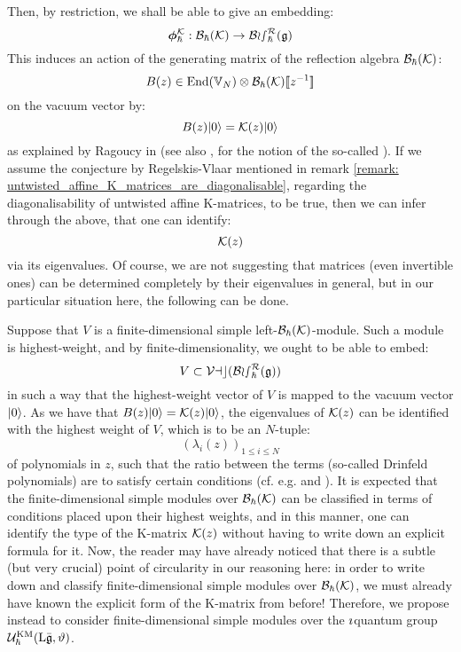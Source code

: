         Then, by restriction, we shall be able to give an embedding:
            $$\boldsymbol{\phi}_{\hbar}^{\mathcal{K}}: \mathcal{B}_{\hbar}(\mathcal{K}) \to \mathcal{Bos}_{\hbar}^{\mathcal{R}}(\mathfrak{g})$$
        This induces an action of the generating matrix of the reflection algebra $\mathcal{B}_{\hbar}(\mathcal{K})$:
            $$B(z) \in \End(\bbV_N) \tensor \calB_{\hbar}(\calK)[\![z^{-1}]\!]$$
        on the vacuum vector by:
            $$B(z) \lvert {0} \rangle = \mathcal{K}(z) \lvert {0} \rangle$$
        as explained by Ragoucy in \cite{ragoucy_vertex_representations_of_reflection_algebras} (see also \cite{ragoucy_vertex_representations_of_R_matrix_quantum_groups}, for the notion of the so-called ). If we assume the conjecture by Regelskis-Vlaar mentioned in remark \ref{remark: untwisted_affine_K_matrices_are_diagonalisable}, regarding the diagonalisability of untwisted affine K-matrices, to be true, then we can infer through the above, that one can identify:
            $$\mathcal{K}(z)$$
        via its eigenvalues. Of course, we are not suggesting that matrices (even invertible ones) can be determined completely by their eigenvalues in general, but in our particular situation here, the following can be done.

        Suppose that $V$ is a finite-dimensional simple left-$\mathcal{B}_{\hbar}(\mathcal{K})$-module. Such a module is highest-weight, and by finite-dimensionality, we ought to be able to embed:
            $$V \subset \mathcal{Vac}( \mathcal{Bos}_{\hbar}^{\mathcal{R}}(\mathfrak{g}) )$$
        in such a way that the highest-weight vector of $V$ is mapped to the vacuum vector $\lvert {0} \rangle$. As we have that $B(z) \lvert {0} \rangle = \mathcal{K}(z) \lvert {0} \rangle$, the eigenvalues of $\mathcal{K}(z)$ can be identified with the highest weight of $V$, which is to be an $N$-tuple:
            $$( \lambda_i(z) )_{1 \leq i \leq N}$$
        of polynomials in $z$, such that the ratio between the terms (so-called Drinfeld polynomials) are to satisfy certain conditions (cf. e.g. \cite{guay_regelskis_wendlandt_representations_of_twisted_yangians_for_symmetric_pairs_of_types_BCD_1} and \cite{guay_regelskis_wendlandt_representations_of_twisted_yangians_for_symmetric_pairs_of_types_BCD_2}). It is expected that the finite-dimensional simple modules over $\mathcal{B}_{\hbar}(\mathcal{K})$ can be classified in terms of conditions placed upon their highest weights, and in this manner, one can identify the type of the K-matrix $\mathcal{K}(z)$ without having to write down an explicit formula for it. Now, the reader may have already noticed that there is a subtle (but very crucial) point of circularity in our reasoning here: in order to write down and classify finite-dimensional simple modules over $\mathcal{B}_{\hbar}(\mathcal{K})$, we must already have known the explicit form of the K-matrix from before! Therefore, we propose instead to consider finite-dimensional simple modules over the $\imath$quantum group $\mathcal{U}_{\hbar}^{\mathrm{KM}}(\mathrm{L} \bar{\mathfrak{g}}, \vartheta)$.

